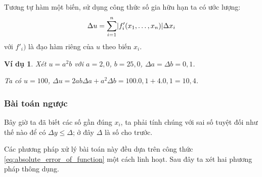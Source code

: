 \documentclass{book}    %
\DeclarePairedDelimiter\abs{\lvert}{\rvert}%
\newtheorem{exmp}{Ví dụ}[chapter]
\begin{document}
Tương tự hàm một biến, sử dụng công thức số gia hữu hạn ta có ước lượng:
\begin{equation} \label{eq:absolute_error_of_function}
    \Delta u = \sum_{i=1}^{n} \abs{f'_i(x_1, \ldots, x_n)} \Delta x_i
\end{equation}
với \(f'_i)\) là đạo hàm riêng của \(u\) theo biến \(x_i\).

\begin{exmp}
    Xét \(u = a^2 b\) với \(a = 2,0\), \(b = 25,0\), \(\Delta a = \Delta b = 0,1\).

    Ta có \(u = 100\), \(\Delta u = 2ab \Delta a + a^2 \Delta b = 100.0,1 +
    4.0,1 = 10,4\).
\end{exmp}

\subsubsection{Bài toán ngược}

Bây giờ ta đã biết các số gần đúng \(x_i\), ta phải tính chúng với sai số tuyệt
đối như thế nào để có \(\Delta y \leq \Delta\); ở đây \(\Delta\) là số cho
trước.

Các phương pháp xử lý bài toán này đều dựa trên công thức
\ref{eq:absolute_error_of_function} một cách linh hoạt. Sau đây ta xét hai
phương pháp thông dụng.
\end{document}
